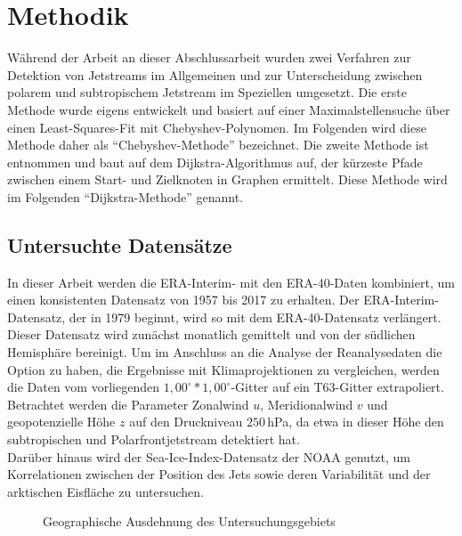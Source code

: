\chapter{Methodik} \label{ch:methodik}
Während der Arbeit an dieser Abschlussarbeit wurden zwei Verfahren zur Detektion von Jetstreams im Allgemeinen und zur Unterscheidung zwischen polarem und subtropischem Jetstream im Speziellen umgesetzt. Die erste Methode wurde eigens entwickelt und basiert auf einer Maximalstellensuche über einen Least-Squares-Fit mit Chebyshev-Polynomen. Im Folgenden wird diese Methode daher als \enquote{Chebyshev-Methode} bezeichnet. Die zweite Methode ist \citet{molnos-2017} entnommen und baut auf dem Dijkstra-Algorithmus auf, der kürzeste Pfade zwischen einem Start- und Zielknoten in Graphen ermittelt. Diese Methode wird im Folgenden \enquote{Dijkstra-Methode} genannt. 

\section{Untersuchte Datensätze}
In dieser Arbeit werden die ERA-Interim- \citep{dee-2011} mit den ERA-40-Daten \citep{uppala-2005} kombiniert, um einen konsistenten Datensatz von 1957 bis 2017 zu erhalten. Der ERA-Interim-Datensatz, der in 1979 beginnt, wird so mit dem ERA-40-Datensatz verlängert. Dieser Datensatz wird zunächst monatlich gemittelt und von der südlichen Hemisphäre bereinigt. Um im Anschluss an die Analyse der Reanalysedaten die Option zu haben, die Ergebnisse mit Klimaprojektionen zu vergleichen, werden die Daten vom vorliegenden $1,00^{\circ} \ast 1,00^{\circ}$-Gitter auf ein T63-Gitter extrapoliert. %
\\
Betrachtet werden die Parameter Zonalwind $u$, Meridionalwind $v$ und geopotenzielle Höhe $z$ auf den Druckniveau $250\,$hPa, da \citet{rikus-2015} etwa in dieser Höhe den subtropischen und Polarfrontjetstream detektiert hat.
\\
Darüber hinaus wird der Sea-Ice-Index-Datensatz der NOAA \citep{sii-2016} genutzt, um Korrelationen zwischen der Position des Jets sowie deren Variabilität und der arktischen Eisfläche zu untersuchen.

\begin{figure}[hbt]
  \centering
  \caption{Geographische Ausdehnung des Untersuchungsgebiets} \label{fig:area}
\end{figure}

